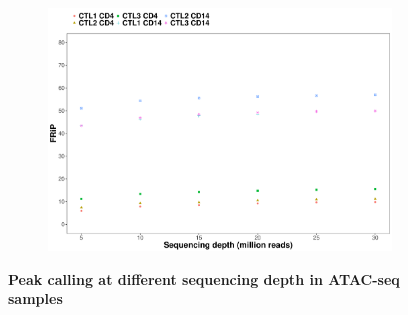 \begin{figure}[htbp]
\begin{subfigure}{0.45\textwidth}
\caption{\textbf{}}
\end{subfigure} \\
\begin{subfigure}{0.5\textwidth}
\centering
\includegraphics[width=\textwidth]{./Results1/pdfs/ATAC_Core_fresh_CD4_CD14_frac_reads_in_peaks_vs_depth}
\caption{\textbf{}} %
\end{subfigure}%
\caption[Peak calling and sequencing depth in ATAC-seq samples]{\textbf{Peak calling at different sequencing depth in ATAC-seq samples} \\
}
\label{fig:Peak_calling_versus_depth_ATAC}
\end{figure} 




